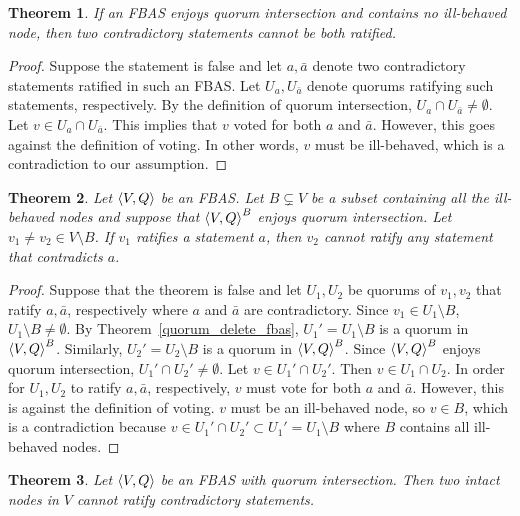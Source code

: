 \documentclass[12pt, psamsfonts]{amsart}
\newtheorem{thm}{Theorem}[subsection]
\theoremstyle{definition}
\theoremstyle{remark}
\numberwithin{equation}{subsection}
\begin{document}
\begin{thm}
    If an FBAS enjoys quorum intersection and contains no ill-behaved node, then two contradictory statements cannot be both ratified.
\end{thm}

\begin{proof}
    Suppose the statement is false and let $a, \bar{a}$ denote two contradictory statements ratified in such an FBAS\@.
    Let $U_a, U_{\bar{a}}$ denote quorums ratifying such statements, respectively.
    By the definition of quorum intersection, $U_a \cap U_{\bar{a}} \ne \emptyset$.
    Let $v \in U_a \cap U_{\bar{a}}$.
    This implies that $v$ voted for both $a$ and $\bar{a}$.
    However, this goes against the definition of voting.
    In other words, $v$ must be ill-behaved, which is a contradiction to our assumption.
\end{proof}

\begin{thm}\label{ill_behaved_ratify}
    Let $\ev{V, Q}$ be an FBAS\@.
    Let $B \subsetneq V$ be a subset containing all the ill-behaved nodes and suppose that $\ev{V, Q}^B$ enjoys quorum intersection.
    Let $v_1 \ne v_2 \in V \setminus B$.
    If $v_1$ ratifies a statement $a$, then $v_2$ cannot ratify any statement that contradicts $a$.
\end{thm}

\begin{proof}
    Suppose that the theorem is false and let $U_1, U_2$ be quorums of $v_1, v_2$ that ratify $a, \bar{a}$, respectively where $a$ and $\bar{a}$ are contradictory.
    Since $v_1 \in U_1 \setminus B$,  $U_1 \setminus B \ne \emptyset$.
    By Theorem~\ref{quorum_delete_fbas}, $U_1' = U_1 \setminus B$ is a quorum in $\ev{V, Q}^B$.
    Similarly, $U_2' = U_2 \setminus B$ is a quorum in $\ev{V, Q}^B$.
    Since $\ev{V, Q}^B$ enjoys quorum intersection, $U_1' \cap U_2' \ne \emptyset$.
    Let $v \in U_1' \cap U_2'$.
    Then $v \in U_1 \cap U_2$.
    In order for $U_1, U_2$ to ratify $a, \bar{a}$, respectively, $v$ must vote for both $a$ and $\bar{a}$.
    However, this is against the definition of voting.
    $v$ must be an ill-behaved node, so $v \in B$, which is a contradiction because $v \in U_1' \cap U_2' \subset U_1' = U_1 \setminus B$ where $B$ contains all ill-behaved nodes.
\end{proof}

\begin{thm}\label{intact_ratify_contradictory}
    Let $\ev{V, Q}$ be an FBAS with quorum intersection.
    Then two intact nodes in $V$ cannot ratify contradictory statements.
\end{thm}
\end{document}
